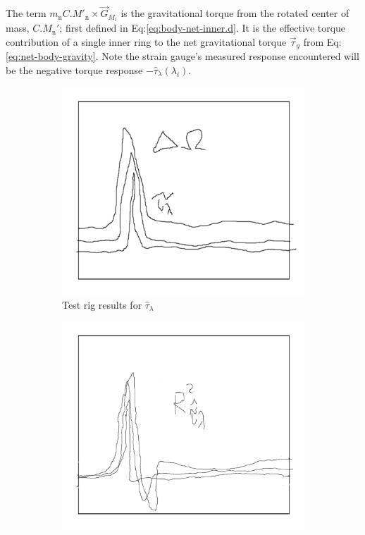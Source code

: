 The term $m_\text{n}C.M'_{\text{n}}\times\vec{G}_{M_i}$ is the gravitational torque from the rotated center of mass, $C.M_{\text{n}}'$; first defined in Eq:\ref{eq:body-net-inner.d}. It is the effective torque contribution of a single inner ring to the net gravitational torque $\vec{\tau}_g$ from Eq:\ref{eq:net-body-gravity}. Note the strain gauge's measured response encountered will be the negative torque response $-\hat{\tau}_\lambda(\lambda_i)$.
\par
\begin{figure}[hbtp]
\vspace{-10pt}
\centering
\begin{subfigure}{0.49\textwidth}
\centering
\includegraphics[width=\textwidth]{graphs/tau-lambda}
\caption{Test rig results for $\hat{\tau}_\lambda$}
\label{fig:tau-lambda}
\end{subfigure}
\begin{subfigure}{0.49\textwidth}
\centering
\includegraphics[width=\textwidth]{graphs/tau-lambda-r}

\end{subfigure}
\end{figure}
